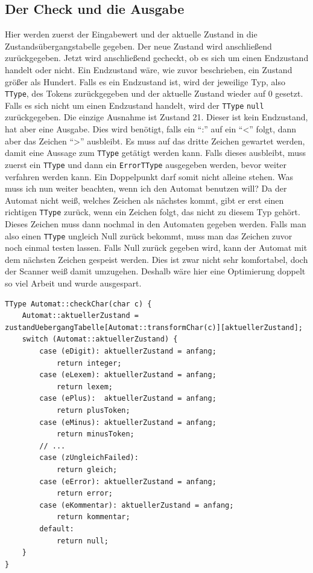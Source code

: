 \documentclass[a4paper,11pt]{report}
\begin{document}
\subsection{Der Check und die Ausgabe}
Hier werden zuerst der Eingabewert und der aktuelle Zustand in die Zustandsübergangstabelle gegeben.
Der neue Zustand wird anschließend zurückgegeben.
Jetzt wird anschließend gecheckt, ob es sich um einen Endzustand handelt oder nicht.
Ein Endzustand wäre, wie zuvor beschrieben, ein Zustand größer als Hundert.
Falls es ein Endzustand ist, wird der jeweilige Typ, also \texttt{TType}, des Tokens zurückgegeben und der aktuelle Zustand wieder auf 0 gesetzt.
Falls es sich nicht um einen Endzustand handelt, wird der \texttt{TType} \texttt{null} zurückgegeben.
Die einzige Ausnahme ist Zustand 21.
Dieser ist kein Endzustand, hat aber eine Ausgabe.
Dies wird benötigt, falls ein "`:"' auf ein "`<"' folgt, dann aber das Zeichen "`>"' ausbleibt.
Es muss auf das dritte Zeichen gewartet werden, damit eine Aussage zum \texttt{TType} getätigt werden kann.
Falls dieses ausbleibt, muss zuerst ein \texttt{TType} und dann ein \texttt{ErrorTType} ausgegeben werden, bevor weiter verfahren werden kann.
Ein Doppelpunkt darf somit nicht alleine stehen.
Was muss ich nun weiter beachten, wenn ich den Automat benutzen will?
Da der Automat nicht weiß, welches Zeichen als nächstes kommt, gibt er erst einen richtigen \texttt{TType} zurück, wenn ein Zeichen folgt, das nicht zu diesem Typ gehört.
Dieses Zeichen muss dann nochmal in den Automaten gegeben werden.
Falls man also einen \texttt{TType} ungleich Null zurück bekommt, muss man das Zeichen zuvor noch einmal testen lassen.
Falls Null zurück gegeben wird, kann der Automat mit dem nächsten Zeichen gespeist werden.
Dies ist zwar nicht sehr komfortabel, doch der Scanner weiß damit umzugehen.
Deshalb wäre hier eine Optimierung doppelt so viel Arbeit und wurde ausgespart.

\begin{lstlisting}[caption=Check und Ausgabe, label=lst:check]
TType Automat::checkChar(char c) {
	Automat::aktuellerZustand = zustandUebergangTabelle[Automat::transformChar(c)][aktuellerZustand];
	switch (Automat::aktuellerZustand) {
		case (eDigit): aktuellerZustand = anfang;
			return integer;
		case (eLexem): aktuellerZustand = anfang;
			return lexem;
        case (ePlus):  aktuellerZustand = anfang;
        	return plusToken;
        case (eMinus): aktuellerZustand = anfang;
            return minusToken;
		// ...
		case (zUngleichFailed):
			return gleich;
		case (eError): aktuellerZustand = anfang;
			return error;
		case (eKommentar): aktuellerZustand = anfang;
			return kommentar;
		default:
			return null;
	}
}
\end{lstlisting}
\end{document}
